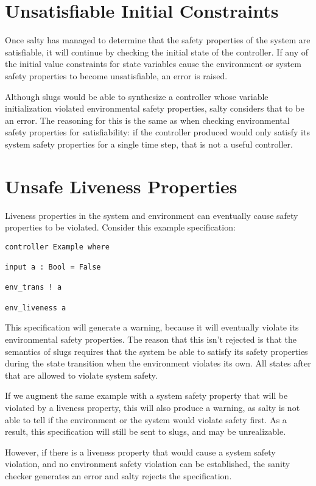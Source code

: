 \section{Unsatisfiable Initial Constraints}

Once salty has managed to determine that the safety properties of the system are 
satisfiable, it will continue by checking the initial state of the controller. 
If any of the initial value constraints for state variables cause the environment 
or system safety properties to become unsatisfiable, an error is raised.

Although slugs would be able to synthesize a controller whose variable initialization 
violated environmental safety properties, salty considers that to be an error. 
The reasoning for this is the same as when checking environmental safety properties 
for satisfiability: if the controller produced would only satisfy its system safety 
properties for a single time step, that is not a useful controller.

\section{Unsafe Liveness Properties}

Liveness properties in the system and environment can eventually cause safety 
properties to be violated. Consider this example specification:
\begin{lstlisting}
controller Example where

input a : Bool = False

env_trans ! a

env_liveness a
\end{lstlisting}
This specification will generate a warning, because it will eventually violate its 
environmental safety properties. The reason that this isn't rejected is that the 
semantics of slugs requires that the system be able to satisfy its safety properties 
during the state transition when the environment violates its own. All states after 
that are allowed to violate system safety.

If we augment the same example with a system safety property that will be violated 
by a liveness property, this will also produce a warning, as salty is not able to 
tell if the environment or the system would violate safety first. As a result, this 
specification will still be sent to slugs, and may be unrealizable.

However, if there is a liveness property that would cause a system safety violation, 
and no environment safety violation can be established, the sanity checker generates 
an error and salty rejects the specification.
